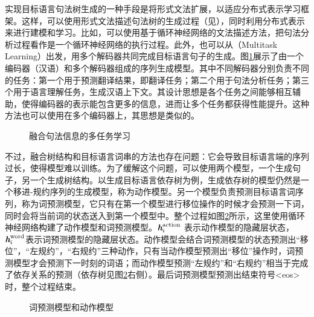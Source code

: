 \parinterval 实现目标语言句法树生成的一种手段是将形式文法扩展，以适应分布式表示学习框架。这样，可以使用形式文法描述句法树的生成过程（见{\chapterthree}），同时利用分布式表示来进行建模和学习。比如，可以使用基于循环神经网络的文法描述方法，把句法分析过程看作是一个循环神经网络的执行过程。此外，也可以从{\small\sffamily{}}（Multitask Learning）出发，用多个解码器共同完成目标语言句子的生成。图\ref{fig:15-25}展示了由一个编码器（汉语）和多个解码器组成的序列生成模型。其中不同解码器分别负责不同的任务：第一个用于预测翻译结果，即翻译任务；第二个用于句法分析任务；第三个用于语言理解任务，生成汉语上下文。其设计思想是各个任务之间能够相互辅助，使得编码器的表示能包含更多的信息，进而让多个任务都获得性能提升。这种方法也可以使用在多个编码器上，其思想是类似的。

\begin{figure}[htp]
\centering

\caption{融合句法信息的多任务学习}
\label{fig:15-25}
\end{figure}

\parinterval 不过，融合树结构和目标语言词串的方法也存在问题：它会导致目标语言端的序列过长，使得模型难以训练。为了缓解这个问题，可以使用两个模型，一个生成句子，另一个生成树结构。以生成目标语言依存树为例，生成依存树的模型仍然是一个移进-规约序列的生成模型，称为动作模型。另一个模型负责预测目标语言词序列，称为词预测模型，它只有在第一个模型进行移位操作的时候才会预测一下词，同时会将当前词的状态送入到第一个模型中。整个过程如图\ref{fig:15-26}所示，这里使用循环神经网络构建了动作模型和词预测模型。$\textbf{\em h}_i^\textrm{action}$ 表示动作模型的隐藏层状态，$\textbf{\em h}_i^\textrm{word}$表示词预测模型的隐藏层状态。动作模型会结合词预测模型的状态预测出“移位”，“左规约”，“右规约”三种动作，只有当动作模型预测出“移位”操作时，词预测模型才会预测下一时刻的词语；而动作模型预测“左规约”和“右规约”相当于完成了依存关系的预测（依存树见图\ref{fig:15-26}右侧）。最后词预测模型预测出结束符号<eos> 时，整个过程结束。

\begin{figure}[htp]
\centering

\caption{词预测模型和动作模型}
\setlength{\abovecaptionskip}{-1em}
\label{fig:15-26}
\end{figure}

